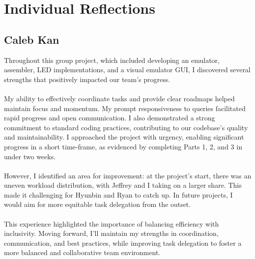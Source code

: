 \documentclass[10pt]{article}
\begin{document}
\section{Individual Reflections}

\subsection{Caleb Kan}
Throughout this group project, which included developing an emulator, assembler, LED implementations, and a visual emulator GUI, I discovered several strengths that positively impacted our team's progress. \\
\\
My ability to effectively coordinate tasks and provide clear roadmaps helped maintain focus and momentum. My prompt responsiveness to queries facilitated rapid progress and open communication. I also demonstrated a strong commitment to standard coding practices, contributing to our codebase's quality and maintainability.
I approached the project with urgency, enabling significant progress in a short time-frame, as evidenced by completing Parts 1, 2, and 3 in under two weeks. \\
\\
However, I identified an area for improvement: at the project's start, there was an uneven workload distribution, with Jeffrey and I taking on a larger share. This made it challenging for Hyunbin and Ryan to catch up. In future projects, I would aim for more equitable task delegation from the outset. \\
\\
This experience highlighted the importance of balancing efficiency with inclusivity. Moving forward, I'll maintain my strengths in coordination, communication, and best practices, while improving task delegation to foster a more balanced and collaborative team environment.
\end{document}

